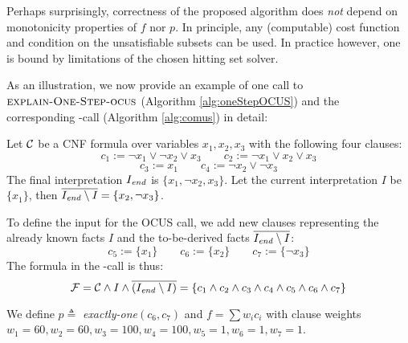 Perhaps surprisingly, correctness of the proposed algorithm does \emph{not} depend on monotonicity properties of $f$ nor $p$. In principle, any (computable) cost function and condition on the unsatisfiable subsets can be used. In practice however, one is bound by limitations of the chosen hitting set solver.

As an illustration, we now provide an example of one call to $\textsc{explain-One-Step-ocus}$ (Algorithm 
\ref{alg:oneStepOCUS}) and the corresponding \comus-call (Algorithm \ref{alg:comus}) in detail: 
\begin{example}
	Let $\mathcal{C} $ be a CNF formula over variables $x_1, x_2, x_3$ with the following four clauses:
		\[ c_1 := \lnot x_1 \vee \lnot x_2 \vee x_3 \qquad  c_2 := \lnot x_1 \vee  x_2 \vee x_3\] \[  c_3 := x_1 \qquad c_4 := \lnot x_2 \vee \lnot x_3 \]
	 The final interpretation $I_\mathit{end} $ is $\{x_1, \lnot x_2,  x_3\}$. Let the current interpretation $I$ be $\{ x_1\}$, then $\overline{I_\mathit{end} \setminus I} =  \{x_2, \lnot x_3\}$.
	 
	 To define the input for the OCUS call, we add new clauses representing the already known facts $I$ and the to-be-derived facts $\overline{I_\mathit{end} \setminus I}$: 
	 \[ c_5 := \{x_1\}\qquad  c_6:=\{x_2\} \qquad  c_7 := \{\lnot x_3\}\]
	 The formula \formula in the \comus-call is thus: 
	 \[\mathcal{F} = \mathcal{C} \land I \land \overline{(I_\mathit{end} \setminus I)} = \{ c_1 \wedge c_2 \wedge c_3\wedge c_4\wedge c_5\wedge c_6\wedge c_7\}\]	
	 	 
	 We define $p\triangleq$ \textit{exactly-one$(c_6, c_7)$} and $f = \sum w_ic_i$ with clause weights $w_1 = 60, w_2=60, w_3=100, w_4=100, w_5=1, w_6=1, w_7=1$.
	 

\end{example}
